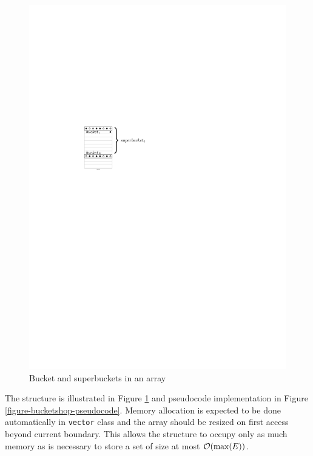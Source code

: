 \begin{figure}
	\label{figure-bucketshop}
	\hfill
	\includegraphics{img/bucketshop.pdf}
	\caption{Bucket and superbuckets in an array}
	\vspace{1cm}
\end{figure}

The structure is illustrated in Figure \ref{figure-bucketshop} and pseudocode
implementation in Figure \ref{figure-bucketshop-pseudocode}. Memory allocation
is expected to be done automatically in {\tt vector} class and the array should
be resized on first access beyond current boundary.  This allows the structure
to occupy only as much memory as is necessary to store a set of size at most
$\mathcal{O}(\max(E))$.

